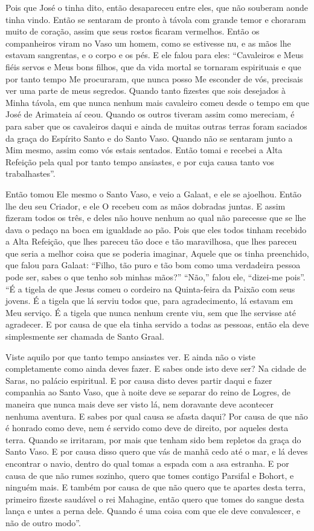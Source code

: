 Pois que José o tinha dito, então desapareceu entre eles, que não souberam aonde
tinha vindo. Então se sentaram de pronto à távola com grande temor e choraram
muito de coração, assim que seus rostos ficaram vermelhos. Então os
companheiros viram no Vaso um homem, como se estivesse nu, e as mãos lhe
estavam sangrentas, e o corpo e os pés. E ele falou para eles: “Cavaleiros e
Meus fiéis servos e Meus bons filhos, que da vida mortal se tornaram
espirituais e que por tanto tempo Me procuraram, que nunca posso Me esconder de
vós, precisais ver uma parte de meus segredos. Quando tanto fizestes que sois
desejados à Minha távola, em que nunca nenhum mais cavaleiro comeu desde o
tempo em que José de Arimateia aí ceou. Quando os outros tiveram assim como
mereciam, é para saber que os cavaleiros daqui e ainda de muitas outras terras
foram saciados da graça do Espírito Santo e do Santo Vaso. Quando não se
sentaram junto a Mim mesmo, assim como vós estais sentados. Então tomai e
recebei a Alta Refeição pela qual por tanto tempo ansiastes, e por cuja causa
tanto vos trabalhastes”.

Então tomou Ele mesmo o Santo Vaso, e veio a Galaat, e ele se ajoelhou. Então
lhe deu seu Criador, e ele O recebeu com as mãos dobradas juntas. E assim
fizeram todos os três, e deles não houve nenhum ao qual não parecesse que se
lhe dava o pedaço na boca em igualdade ao pão. Pois que eles todos tinham
recebido a Alta Refeição, que lhes pareceu tão doce e tão maravilhosa, que lhes
pareceu que seria a melhor coisa que se poderia imaginar, Aquele que os tinha
preenchido, que falou para Galaat: “Filho, tão puro e tão bom como uma
verdadeira pessoa pode ser, sabes o que tenho sob minhas mãos?” “Não,” falou
ele, “dizei-me pois”. “É a tigela de que Jesus comeu o cordeiro na Quinta-feira
da Paixão com seus jovens. É a tigela que lá serviu todos que, para
agradecimento, lá estavam em Meu serviço. É a tigela que nunca nenhum crente
viu, sem que lhe servisse até agradecer. E por causa de que ela tinha servido a
todas as pessoas, então ela deve simplesmente ser chamada de Santo Graal. 

Viste aquilo por que tanto tempo ansiastes ver. E ainda não o viste
completamente como ainda deves fazer. E sabes onde isto deve ser? Na cidade de
Saras, no palácio espiritual. E por causa disto deves partir daqui e fazer
companhia ao Santo Vaso, que à noite deve se separar do reino de Logres, de
maneira que nunca mais deve ser visto lá, nem doravante deve acontecer nenhuma
aventura. E sabes por qual causa se afasta daqui? Por causa de que não é
honrado como deve, nem é servido como deve de direito, por aqueles desta terra.
Quando se irritaram, por mais que tenham sido bem repletos da graça do Santo
Vaso. E por causa disso quero que vás de manhã cedo até o mar, e lá deves
encontrar o navio, dentro do qual tomas a espada com a asa estranha. E por
causa de que não rumes sozinho, quero que tomes contigo Parsifal e Bohort, e
ninguém mais. E também por causa de que não quero que te apartes desta terra,
primeiro fizeste saudável o rei Mahagine, então quero que tomes do sangue desta
lança e untes a perna dele. Quando é uma coisa com que ele deve convalescer, e
não de outro modo”.

